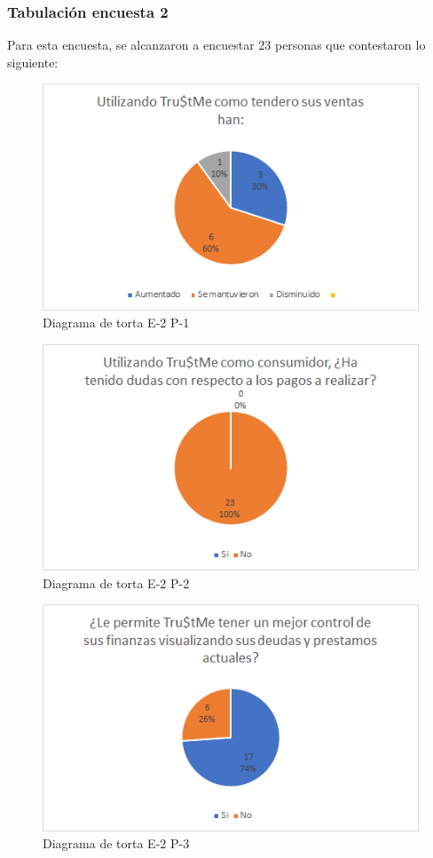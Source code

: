 {\begin{enumerate}
			\end{enumerate}
		
		\subsubsection*{Tabulación encuesta 2}
		
		{Para esta encuesta, se alcanzaron a encuestar 23 personas que contestaron lo siguiente:
			
			\begin{figure}[H]
				\centering
				\includegraphics[width=0.8\linewidth]{annexes/e2-p1.png}
				\caption{Diagrama de torta E-2 P-1}
			\end{figure}
			
			\begin{figure}[H]
				\centering
				\includegraphics[width=0.8\linewidth]{annexes/e2-p2.png}
				\caption{Diagrama de torta E-2 P-2}
			\end{figure}
			
			\begin{figure}[H]
				\centering
				\includegraphics[width=0.8\linewidth]{annexes/e2-p3.png}
				\caption{Diagrama de torta E-2 P-3}
			\end{figure}
		}
		
	}
	

	